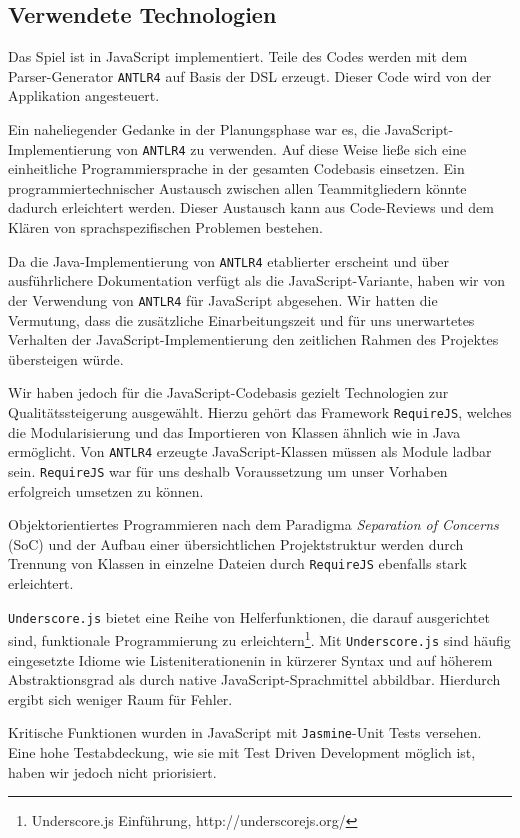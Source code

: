 \documentclass[conference]{IEEEtran}
\begin{document}
\subsection{Verwendete Technologien}
Das Spiel ist in JavaScript implementiert. Teile des Codes werden mit dem Parser-Generator \texttt{ANTLR4} auf Basis der DSL erzeugt. Dieser Code wird von der Applikation angesteuert.

Ein naheliegender Gedanke in der Planungsphase war es, die JavaScript-Implementierung von \texttt{ANTLR4} zu verwenden. Auf diese Weise ließe sich eine einheitliche Programmiersprache in der gesamten Codebasis einsetzen. Ein programmiertechnischer Austausch zwischen allen Teammitgliedern könnte dadurch erleichtert werden. Dieser Austausch kann aus Code-Reviews und dem Klären von sprachspezifischen Problemen bestehen.

Da die Java-Implementierung von \texttt{ANTLR4} etablierter erscheint und über ausführlichere Dokumentation verfügt als die JavaScript-Variante, haben wir von der Verwendung von \texttt{ANTLR4} für JavaScript abgesehen. Wir hatten die Vermutung, dass die zusätzliche Einarbeitungszeit und für uns unerwartetes Verhalten der JavaScript-Implementierung den zeitlichen Rahmen des Projektes übersteigen würde.

Wir haben jedoch für die JavaScript-Codebasis gezielt Technologien zur Qualitätssteigerung ausgewählt. Hierzu gehört das Framework \texttt{RequireJS}, welches die Modularisierung und das Importieren von Klassen ähnlich wie in Java ermöglicht. Von \texttt{ANTLR4} erzeugte JavaScript-Klassen müssen als Module ladbar sein. \texttt{RequireJS} war für uns deshalb Voraussetzung um unser  Vorhaben erfolgreich umsetzen zu können.

Objektorientiertes Programmieren nach dem Paradigma \emph{Separation of Concerns} (SoC) und der Aufbau einer übersichtlichen Projektstruktur werden durch Trennung von Klassen in einzelne Dateien durch \texttt{RequireJS} ebenfalls stark erleichtert.

\texttt{Underscore.js} bietet eine Reihe von Helferfunktionen, die darauf ausgerichtet sind, funktionale Programmierung zu erleichtern\footnote[1]{Underscore.js Einführung, http://underscorejs.org/}. Mit \texttt{Underscore.js} sind häufig eingesetzte Idiome wie Listeniterationenin in kürzerer Syntax und auf höherem Abstraktionsgrad als durch native JavaScript-Sprachmittel abbildbar. Hierdurch ergibt sich weniger Raum für Fehler.

Kritische Funktionen wurden in JavaScript mit \texttt{Jasmine}-Unit Tests versehen. Eine hohe Testabdeckung, wie sie mit Test Driven Development möglich ist, haben wir jedoch nicht priorisiert.
\end{document}
